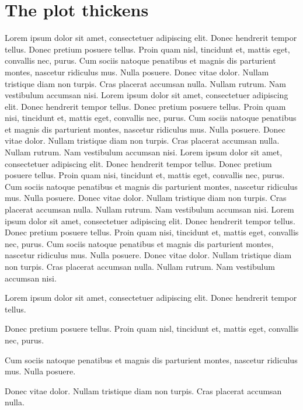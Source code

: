 \documentclass[12pt]{report}
\begin{document}
\chapter{The plot thickens}

Lorem ipsum dolor sit amet, consectetuer adipiscing elit. Donec
hendrerit tempor tellus. Donec pretium posuere tellus. Proin quam
nisl, tincidunt et, mattis eget, convallis nec, purus. Cum sociis
natoque penatibus et magnis dis parturient montes, nascetur ridiculus
mus. Nulla posuere. Donec vitae dolor. Nullam tristique diam non
turpis. Cras placerat accumsan nulla. Nullam rutrum. Nam vestibulum
accumsan nisi.  Lorem ipsum dolor sit amet, consectetuer adipiscing
elit. Donec hendrerit tempor tellus. Donec pretium posuere
tellus. Proin quam nisi, tincidunt et, mattis eget, convallis nec,
purus. Cum sociis natoque penatibus et magnis dis parturient montes,
nascetur ridiculus mus. Nulla posuere. Donec vitae dolor. Nullam
tristique diam non turpis. Cras placerat accumsan nulla. Nullam
rutrum. Nam vestibulum accumsan nisi.  Lorem ipsum dolor sit amet,
consectetuer adipiscing elit. Donec hendrerit tempor tellus. Donec
pretium posuere tellus. Proin quam nisi, tincidunt et, mattis eget,
convallis nec, purus. Cum sociis natoque penatibus et magnis dis
parturient montes, nascetur ridiculus mus. Nulla posuere. Donec vitae
dolor. Nullam tristique diam non turpis. Cras placerat accumsan
nulla. Nullam rutrum. Nam vestibulum accumsan nisi.  Lorem ipsum dolor
sit amet, consectetuer adipiscing elit. Donec hendrerit tempor
tellus. Donec pretium posuere tellus. Proin quam nisi, tincidunt et,
mattis eget, convallis nec, purus. Cum sociis natoque penatibus et
magnis dis parturient montes, nascetur ridiculus mus. Nulla
posuere. Donec vitae dolor. Nullam tristique diam non turpis. Cras
placerat accumsan nulla. Nullam rutrum. Nam vestibulum accumsan nisi.


\begin{war} 
Lorem ipsum dolor sit amet, consectetuer adipiscing elit. Donec
hendrerit tempor tellus.
\end{war}


Donec pretium posuere tellus. Proin quam nisl, tincidunt et, mattis
eget, convallis nec, purus. 


\begin{ques}
Cum sociis natoque penatibus et magnis dis parturient montes, nascetur
ridiculus mus. Nulla posuere. 
\end{ques}

Donec vitae dolor. Nullam tristique diam non turpis. Cras placerat
accumsan nulla. 
\end{document}
